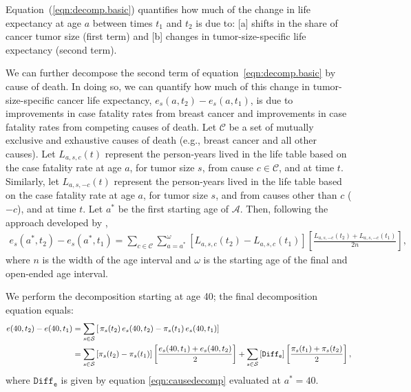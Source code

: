 \documentclass[11pt,letterpaper]{article}
\theoremstyle{plain}
\begin{document}
Equation~(\ref{eqn:decomp.basic}) quantifies how much of the change in life
expectancy at age $a$ between times $t_1$ and $t_2$ is due to: [a]
shifts in the share of cancer tumor size (first term) and [b] changes
in tumor-size-specific life expectancy (second term).

We can further decompose the second term of
equation~\ref{eqn:decomp.basic} by cause of death. In doing so, we can
quantify how much of this change in tumor-size-specific cancer life
expectancy, $e_s(a,t_2)-e_s(a,t_1)$, is due to improvements in case
fatality rates from breast cancer and improvements in case fatality
rates from  competing causes of death.  Let $\mathcal{C}$ be a set of
mutually exclusive and exhaustive causes of death (e.g., breast cancer
and all other causes).  Let $L_{a,s,c}(t)$ represent the person-years
lived in the life table based on the case fatality rate at age $a$,
for tumor size $s$, from cause $c\in\mathcal{C}$, and at time $t$.
Similarly, let $L_{a,s,-c}(t)$ represent the person-years lived in the
life table based on the case fatality rate at age $a$, for tumor size
$s$, and from causes other than $c$ ($-c$), and at time $t$.  Let $a^*$ be
the first starting age of $\mathcal{A}$.  Then, following the approach
developed by \cite{BelPreCan08},
\begin{eqnarray}
e_s(a^*,t_2)-e_s(a^*,t_1)= \sum_{c\in\mathcal{C}}\sum_{a=a^*}^\omega \left[L_{a,s,c}(t_2)-L_{a,s,c}(t_1) \right] \left[\frac{L_{a,s,-c}(t_2)+L_{a,s,-c}(t_1) }{2n} \right],
\label{eqn:causedecomp}
\end{eqnarray}
where $n$ is the width of the age interval and $\omega$ is the
starting age of the final and open-ended age interval.

We perform the decomposition starting at age 40; the final
decomposition equation equals:
\begin{align*}
  e(40,t_2)-e(40,t_1)&=\sum_{s\in\mathcal{S}}\left[\,\pi_s(t_2)\,e_s(40,t_2)- \pi_s(t_1)\,e_s(40,t_1)\right] \notag \\
                     &=\sum_{s\in\mathcal{S}}\left[\pi_s(t_2)-\pi_s(t_1) \right]\left[\frac{e_s(40,t_1)+e_s(40,t_2)}{2}\right]+\sum_{s\in\mathcal{S}}\left[\mathtt{Diff_e} \right]\left[\frac{\pi_s(t_1)+\pi_s(t_2)}{2}\right],
\end{align*}
where $\mathtt{Diff_e}$ is given by equation \eqref{eqn:causedecomp} evaluated at $a^*=40$.\\
\end{document}

